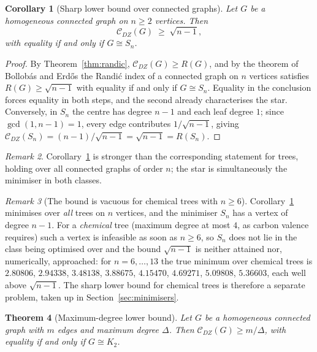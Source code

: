 \documentclass[11pt,a4paper]{article}
\theoremstyle{plain}
\newtheorem{theorem}{Theorem}[section]
\newtheorem{corollary}[theorem]{Corollary}
\theoremstyle{definition}
\theoremstyle{remark}
\newtheorem{remark}[theorem]{Remark}
\newcommand{\CDZ}{\mathcal{C}_{DZ}}
\newcommand{\gcdd}{\operatorname{gcd}}
\begin{document}
\begin{corollary}[Sharp lower bound over connected graphs]
\label{cor:conn_lower}
Let $G$ be a homogeneous connected graph on $n\ge2$ vertices. Then
\[
  \CDZ(G)\;\ge\;\sqrt{n-1},
\]
with equality if and only if $G\cong S_n$.
\end{corollary}

\begin{proof}
By Theorem~\ref{thm:randic}, $\CDZ(G)\ge R(G)$, and by the theorem of
Bollob\'as and Erd\H{o}s \cite{bollobas1998} the Randi\'c index of a connected
graph on $n$ vertices satisfies $R(G)\ge\sqrt{n-1}$ with equality if and only if
$G\cong S_n$. Equality in the conclusion forces equality in both steps, and the
second already characterises the star. Conversely, in $S_n$ the centre has degree
$n-1$ and each leaf degree $1$; since $\gcdd(1,n-1)=1$, every edge contributes
$1/\sqrt{n-1}$, giving $\CDZ(S_n)=(n-1)/\sqrt{n-1}=\sqrt{n-1}=R(S_n)$.
\end{proof}

\begin{remark}
Corollary~\ref{cor:conn_lower} is stronger than the corresponding statement for
trees, holding over all connected graphs of order $n$; the star is
simultaneously the minimiser in both classes.
\end{remark}

\begin{remark}[The bound is vacuous for chemical trees with $n\ge6$]
\label{rem:chemical_gap}
Corollary~\ref{cor:conn_lower} minimises over \emph{all} trees on $n$ vertices,
and the minimiser $S_n$ has a vertex of degree $n-1$. For a \emph{chemical} tree
(maximum degree at most $4$, as carbon valence requires) such a vertex is
infeasible as soon as $n\ge6$, so $S_n$ does not lie in the class being
optimised over and the bound $\sqrt{n-1}$ is neither attained nor, numerically,
approached: for $n=6,\dots,13$ the true minimum over chemical trees is
$2.80806$, $2.94338$, $3.48138$, $3.88675$, $4.15470$, $4.69271$, $5.09808$,
$5.36603$, each well above $\sqrt{n-1}$. The sharp lower bound for chemical
trees is therefore a separate problem, taken up in
Section~\ref{sec:minimisers}.
\end{remark}

\begin{theorem}[Maximum-degree lower bound]
\label{thm:lower_delta}
Let $G$ be a homogeneous connected graph with $m$ edges and maximum degree
$\Delta$. Then $\CDZ(G)\ge m/\Delta$, with equality if and only if $G\cong K_2$.
\end{theorem}
\end{document}
